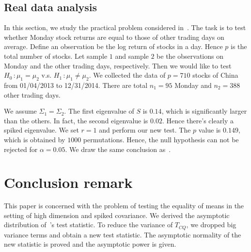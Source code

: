 \documentclass[review]{elsarticle}
\theoremstyle{plain}
\theoremstyle{definition}
\theoremstyle{remark}
\begin{document}

\subsection{Real data analysis}
In this section, we study the practical problem considered in~\cite{Ma2015A}.
The task is to test whether Monday stock returns are equal to those of other trading days on average.
Define an observation be the log return of stocks in a day.
Hence $p$ is the total number of stocks.
Let sample $1$ and sample $2$ be the observations on Monday and the other trading days, respectively.
Then we would like to test $H_0\, :\mu_1=\mu_2$ v.s. $H_1\,:\mu_1\neq \mu_2$.
We collected the data of $p=710$
 stocks of China
from 01/04/2013 to 12/31/2014. There are total $n_1=95$ Monday and $n_2=388$ other trading days. 

We assume $\Sigma_1=\Sigma_2$.
The first eigenvalue of $S$ is $0.14$, which is significantly larger than the others.
In fact, the second eigenvalue is $0.02$.
Hence there's clearly a spiked eigenvalue.
We set $r=1$ and perform our new test.
The $p$ value is $0.149$, which is obtained by $1000$ permutations.
Hence, the null hypothesis can not be rejected for $\alpha=0.05$.
We draw the same conclusion as~\cite{Ma2015A}.

\section{Conclusion remark}



This paper is concerned with the problem of testing the equality of means in the setting of high dimension and spiked covariance.
We derived the asymptotic distribution of~\cite{Chen2010A}'s test statistic.
To reduce the variance of $T_{CQ}$, we dropped big variance terms and obtain a new test statistic. The asymptotic normality of the new statistic is proved and the asymptotic power is given. %
\end{document}
